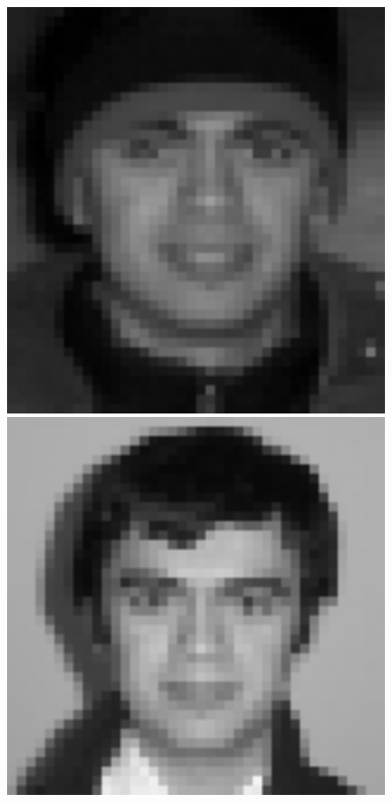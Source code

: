 \begin{figure}[H]
\begin{minipage}[b]{0.2\textwidth}
	    \includegraphics[width=1.01\textwidth]{season3/304/images/face2.jpg}
	  \end{minipage}
	  \hspace{0.2cm}
	  \begin{minipage}[b]{0.2\textwidth}
	    \includegraphics[width=1.08\textwidth]{season3/304/images/face3.jpg}

\end{minipage}
\end{figure}
